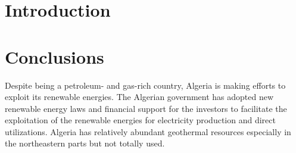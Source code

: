 \documentclass[a0,portrait]{a0poster}
\begin{document}
\vspace{1cm} %


\begin{multicols}{2} %


    \color{Navy} %

    \begin{abstract}
        We report the status of the ensemble generation effort of the Extended Twisted Mass Collaboration towards
        controlled continuum and infinite volume extrapolations for a variety of physical observables through simulations employing Nf = 2 + 1 + 1 Wilson clover twisted mass fermions at physical quark masses using five
        lattice spacings. We further give an update on the status of the tmLQCD software suite. Through extensions
        of the QUDA lattice QCD library and a corresponding interface in tmLQCD, we are able to offload a significant portion of our HMC to GPUs, enabling efficient simulations on the current generation of heterogeneous
        machines.
    \end{abstract}

    \color{Black} %
    \section*{Introduction}



    \color{SaddleBrown} %

    \section*{Conclusions}
    Despite being a petroleum- and gas-rich country, Algeria is making efforts to exploit its renewable energies. The Algerian government has adopted new renewable energy laws and financial support for the investors to facilitate the exploitation of the renewable energies for electricity production and direct utilizations. Algeria has relatively abundant geothermal resources especially in the northeastern parts but not totally used.
    \color{Black} %


\end{multicols}
\end{document}
